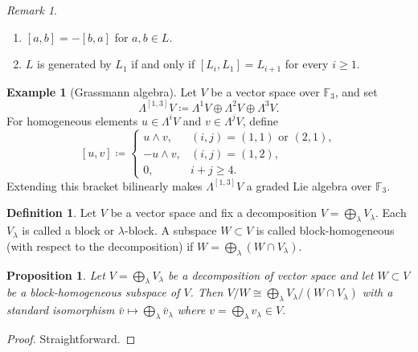 \documentclass[11pt,reqno]{article}
\newtheorem{proposition}[theorem]{Proposition}
\theoremstyle{definition}
\newtheorem{definition}[theorem]{Definition}
\newtheorem{example}[theorem]{Example}
\theoremstyle{remark}
\newtheorem{remark}[theorem]{Remark}
\begin{document}
\begin{remark}
    \begin{enumerate}
        \item $[a,b]=-[b,a]$ for $a,b\in L$.
        \item $L$ is generated by $L_1$ if and only if
        $[L_i,L_1]=L_{i+1}$ for every $i\geq1$.
    \end{enumerate}
\end{remark}

\begin{example}[Grassmann algebra]\label{example:Grassmann algebra}
    Let $V$ be a vector space over $\mathbb F_3$, and set
    \[
    \Lambda^{[1,3]}V
    \coloneqq \Lambda^1V\oplus\Lambda^2V\oplus\Lambda^3V.
    \]
    For homogeneous elements $u\in\Lambda^iV$ and $v\in\Lambda^jV$, define
    \[
    [u,v]\coloneqq
    \begin{cases}
        u\wedge v,&(i,j)=(1,1)\text{ or }(2,1),\\
        -u\wedge v,&(i,j)=(1,2),\\
        0,&i+j\geq4.
    \end{cases}
    \]
    Extending this bracket bilinearly makes $\Lambda^{[1,3]}V$ a graded Lie
    algebra over $\mathbb F_3$.
\end{example}

\begin{definition}
    Let $V$ be a vector space and fix a decomposition $V=\bigoplus_\lambda V_\lambda$.
    Each $V_\lambda$ is called a block or $\lambda$-block.
    A subspace $W\subset V$ is called block-homogeneous (with respect to the decomposition) if $W=\bigoplus_\lambda (W\cap V_\lambda)$.
\end{definition}

\begin{proposition}
    Let $V=\bigoplus_\lambda V_\lambda$ be a decomposition of vector space and let $W\subset V$ be a block-homogeneous subspace of $V$.
    Then $V/W\cong\bigoplus_\lambda V_\lambda/(W\cap V_\lambda)$ with a standard isomorphism $\bar v \mapsto \bigoplus_\lambda \bar v_\lambda$ where $v=\bigoplus_\lambda v_\lambda \in V$.
\end{proposition}
\begin{proof}
    Straightforward.
\end{proof}
\end{document}
